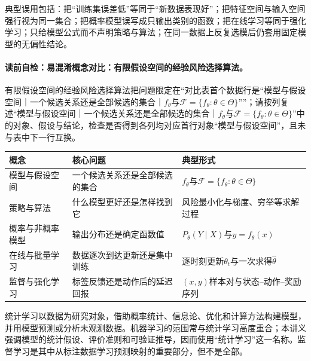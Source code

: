 \begin{warningbox}\label{schema:V1-C09:CH-30}
典型误用包括：把“训练集误差低”等同于“新数据表现好”；把特征空间与输入空间强行视为同一集合；把概率模型误写成只输出类别的函数；把在线学习等同于强化学习；只给模型公式而不声明策略与算法；在同一数据上反复选模后仍套用固定模型的无偏性结论。
\end{warningbox}

\paragraph{读前自检：易混淆概念对比：有限假设空间的经验风险选择算法。}有限假设空间的经验风险选择算法把问题限定在“对比表首个数据行是“模型与假设空间｜一个候选关系还是全部候选的集合｜$f_\theta$与$\mathcal F=\{f_\theta:\theta\in\Theta\}$””；请按列复述“模型与假设空间｜一个候选关系还是全部候选的集合｜$f_\theta$与$\mathcal F=\{f_\theta:\theta\in\Theta\}$”中的对象、假设与结论，检查是否得到各列均对应首行对象“模型与假设空间”，且未与表中下一行互换。\par

\begin{comparisonbox}\label{schema:V1-C09:CH-31}
\begin{tabularx}{\linewidth}{@{}lXX@{}}
\toprule
概念 & 核心问题 & 典型形式\\
\midrule
模型与假设空间 & 一个候选关系还是全部候选的集合 & $f_\theta$与$\mathcal F=\{f_\theta:\theta\in\Theta\}$\\
策略与算法 & 什么模型更好还是怎样找到它 & 风险最小化与梯度、穷举等求解过程\\
概率与非概率模型 & 输出分布还是确定函数值 & $P_\theta(Y\mid X)$与$y=f_\theta(x)$\\
在线与批量学习 & 数据逐次到达更新还是集中训练 & 逐时刻更新$\theta_t$与一次求得$\widehat\theta$\\
监督与强化学习 & 标签反馈还是动作后的延迟回报 & $(x,y)$样本对与状态--动作--奖励序列\\
\bottomrule
\end{tabularx}
\end{comparisonbox}

统计学习以数据为研究对象，借助概率统计、信息论、优化和计算方法构建模型，并用模型预测或分析未观测数据。机器学习的范围常与统计学习高度重合；本讲义强调模型的统计假设、评价准则和可验证推导，因而使用“统计学习”这一名称。监督学习是其中从标注数据学习预测映射的重要部分，但不是全部。

